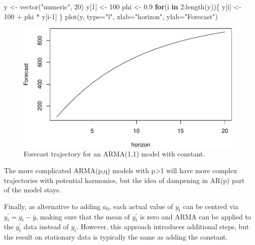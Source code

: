 \documentclass[
]{book}
\newenvironment{Shaded}{\begin{snugshade}}{\end{snugshade}}
\newcommand{\AttributeTok}[1]{\textcolor[rgb]{0.77,0.63,0.00}{#1}}
\newcommand{\ControlFlowTok}[1]{\textcolor[rgb]{0.13,0.29,0.53}{\textbf{#1}}}
\newcommand{\DecValTok}[1]{\textcolor[rgb]{0.00,0.00,0.81}{#1}}
\newcommand{\FloatTok}[1]{\textcolor[rgb]{0.00,0.00,0.81}{#1}}
\newcommand{\FunctionTok}[1]{\textcolor[rgb]{0.00,0.00,0.00}{#1}}
\newcommand{\NormalTok}[1]{#1}
\newcommand{\OtherTok}[1]{\textcolor[rgb]{0.56,0.35,0.01}{#1}}
\newcommand{\SpecialCharTok}[1]{\textcolor[rgb]{0.00,0.00,0.00}{#1}}
\newcommand{\StringTok}[1]{\textcolor[rgb]{0.31,0.60,0.02}{#1}}
\theoremstyle{definition}
\theoremstyle{definition}
\theoremstyle{definition}
\theoremstyle{definition}
\theoremstyle{remark}
\begin{document}
\begin{Shaded}
\begin{Highlighting}[]
\NormalTok{y }\OtherTok{\textless{}{-}} \FunctionTok{vector}\NormalTok{(}\StringTok{"numeric"}\NormalTok{, }\DecValTok{20}\NormalTok{)}
\NormalTok{y[}\DecValTok{1}\NormalTok{] }\OtherTok{\textless{}{-}} \DecValTok{100}
\NormalTok{phi }\OtherTok{\textless{}{-}} \FloatTok{0.9}
\ControlFlowTok{for}\NormalTok{(i }\ControlFlowTok{in} \DecValTok{2}\SpecialCharTok{:}\FunctionTok{length}\NormalTok{(y))\{}
\NormalTok{    y[i] }\OtherTok{\textless{}{-}} \DecValTok{100} \SpecialCharTok{+}\NormalTok{ phi }\SpecialCharTok{*}\NormalTok{ y[i}\DecValTok{{-}1}\NormalTok{]}
\NormalTok{\}}
\FunctionTok{plot}\NormalTok{(y, }\AttributeTok{type=}\StringTok{"l"}\NormalTok{, }\AttributeTok{xlab=}\StringTok{"horizon"}\NormalTok{, }\AttributeTok{ylab=}\StringTok{"Forecast"}\NormalTok{)}
\end{Highlighting}
\end{Shaded}

\begin{figure}
\centering
\includegraphics{Svetunkov--2022----ADAM_files/figure-latex/ARMAConstantTrajectory-1.pdf}
\caption{\label{fig:ARMAConstantTrajectory}Forecast trajectory for an ARMA(1,1) model with constant.}
\end{figure}

The more complicated ARMA(p,q) models with p\textgreater1 will have more complex trajectories with potential harmonics, but the idea of dampening in AR(p) part of the model stays.

Finally, as alternative to adding \(a_0\), each actual value of \(y_t\) can be centred via \(y^\prime_t = y_t -\bar{y}\), making sure that the mean of \(y^\prime_t\) is zero and ARMA can be applied to the \(y^\prime_t\) data instead of \(y_t\). However, this approach introduces additional steps, but the result on stationary data is typically the same as adding the constant.
\end{document}
